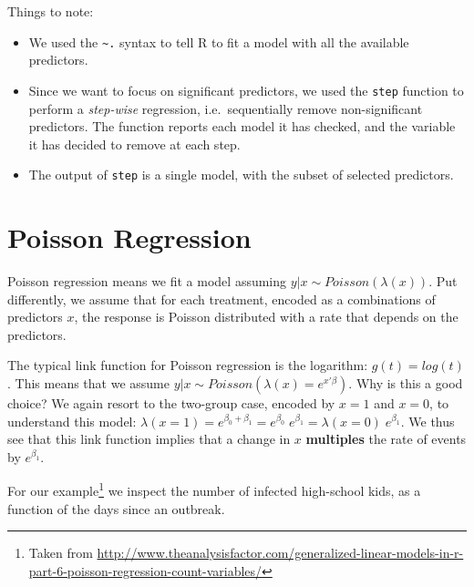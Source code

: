 \documentclass[]{book}
\providecommand{\tightlist}{%
  \setlength{\itemsep}{0pt}\setlength{\parskip}{0pt}}
\theoremstyle{definition}
\theoremstyle{definition}
\theoremstyle{definition}
\theoremstyle{remark}
\begin{document}
Things to note:

\begin{itemize}
\tightlist
\item
  We used the \texttt{\textasciitilde{}.} syntax to tell R to fit a
  model with all the available predictors.
\item
  Since we want to focus on significant predictors, we used the
  \texttt{step} function to perform a \emph{step-wise} regression,
  i.e.~sequentially remove non-significant predictors. The function
  reports each model it has checked, and the variable it has decided to
  remove at each step.
\item
  The output of \texttt{step} is a single model, with the subset of
  selected predictors.
\end{itemize}

\section{Poisson Regression}\label{poisson-regression}

Poisson regression means we fit a model assuming
\(y|x \sim Poisson(\lambda(x))\). Put differently, we assume that for
each treatment, encoded as a combinations of predictors \(x\), the
response is Poisson distributed with a rate that depends on the
predictors.

The typical link function for Poisson regression is the logarithm:
\(g(t)=log(t)\). This means that we assume
\(y|x \sim Poisson(\lambda(x) = e^{x'\beta})\). Why is this a good
choice? We again resort to the two-group case, encoded by \(x=1\) and
\(x=0\), to understand this model:
\(\lambda(x=1)=e^{\beta_0+\beta_1}=e^{\beta_0} \; e^{\beta_1}= \lambda(x=0) \; e^{\beta_1}\).
We thus see that this link function implies that a change in \(x\)
\textbf{multiples} the rate of events by \(e^{\beta_1}\).

For our example\footnote{Taken from
  \url{http://www.theanalysisfactor.com/generalized-linear-models-in-r-part-6-poisson-regression-count-variables/}}
we inspect the number of infected high-school kids, as a function of the
days since an outbreak.
\end{document}
